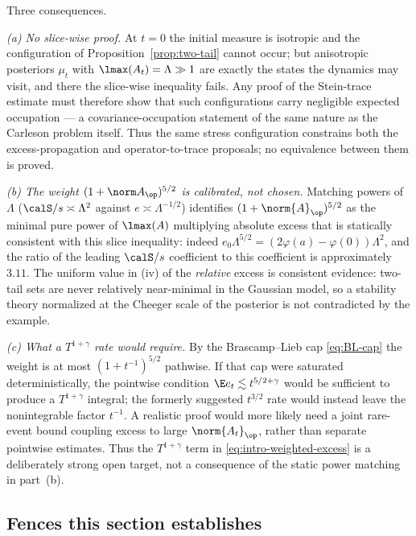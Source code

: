\documentclass[../../main.tex]{subfiles}
\begin{document}
\begin{remark}
\label{rem:weight-explains-rate}
Three consequences.

\emph{(a) No slice-wise proof.} At $t=0$ the initial measure is isotropic and the configuration
of Proposition~\ref{prop:two-tail} cannot occur; but anisotropic posteriors
$\mu_t$ with $\lmax(A_t)=\Lambda\gg1$ are exactly the states the dynamics may visit, and there
the slice-wise inequality fails. Any proof of the Stein-trace estimate must therefore show that
such configurations carry negligible expected occupation --- a covariance-occupation statement
of the same nature as the Carleson problem itself. Thus the same stress configuration constrains
both the excess-propagation and operator-to-trace proposals; no equivalence between them is proved.

\emph{(b) The weight $(1+\norm A_\op)^{5/2}$ is calibrated, not chosen.} Matching powers of
$\Lambda$ ($\calS/s\asymp\Lambda^2$ against $e\asymp\Lambda^{-1/2}$) identifies
$(1+\norm{A}_\op)^{5/2}$ as the minimal pure power of $\lmax(A)$ multiplying absolute excess
that is statically consistent with this slice inequality: indeed
$e_0\Lambda^{5/2}=(2\varphi(a)-\varphi(0))\Lambda^2$, and the ratio of the leading
$\calS/s$ coefficient to this coefficient is approximately $3.11$. The
uniform value in (iv) of the \emph{relative} excess is consistent evidence: two-tail sets
are never relatively near-minimal in the Gaussian model, so a stability theory normalized at
the Cheeger scale of the posterior is not contradicted by the example.

\emph{(c) What a $T^{1+\gamma}$ rate would require.} By the Brascamp--Lieb cap
\eqref{eq:BL-cap} the weight is at most $(1+t^{-1})^{5/2}$ pathwise. If that cap were saturated
deterministically, the pointwise condition $\E e_t\lesssim t^{5/2+\gamma}$ would be sufficient to
produce a $T^{1+\gamma}$ integral; the formerly suggested $t^{3/2}$ rate would instead leave the
nonintegrable factor $t^{-1}$. A realistic proof would more likely need a joint rare-event bound
coupling excess to large $\norm{A_t}_\op$, rather than separate pointwise estimates. Thus the
$T^{1+\gamma}$ term in \eqref{eq:intro-weighted-excess} is a deliberately strong open target,
not a consequence of the static power matching in part~(b).
\end{remark}
\subsection{Fences this section establishes}
\label{subsec:qcts-fences}
\end{document}
